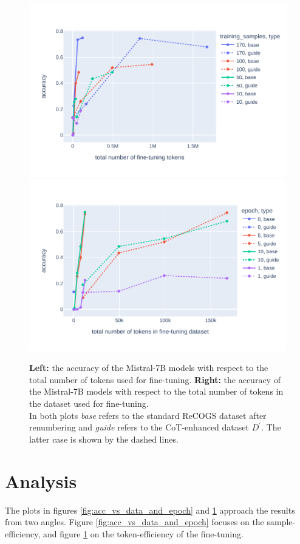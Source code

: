 \documentclass[11pt]{article}
\begin{document}
    \begin{figure}
        \centering
        \includegraphics[width=0.49\linewidth]{../plots/accuracy_vs_epochtoken.pdf}
        \includegraphics[width=0.49\linewidth]{../plots/accuracy_vs_trainingtoken.pdf}
        \caption{
            \textbf{Left:} the accuracy of the Mistral-7B models with respect to the total number of tokens used for fine-tuning.
            \textbf{Right:} the accuracy of the Mistral-7B models with respect to the total number of tokens in the
            dataset used for fine-tuning.\\
            In both plots \emph{base} refers to the standard ReCOGS dataset after renumbering and \emph{guide}
            refers to the CoT-enhanced dataset $D^\prime$. The latter case is shown by the dashed lines.
        }
        \label{fig:acc_vs_token}
    \end{figure}


    \section{Analysis}
    The plots in figures \ref{fig:acc_vs_data_and_epoch} and \ref{fig:acc_vs_token} approach the results from two angles.
    Figure \ref{fig:acc_vs_data_and_epoch} focuses on the sample-efficiency, and figure \ref{fig:acc_vs_token} on the
    token-efficiency of the fine-tuning.
\end{document}
